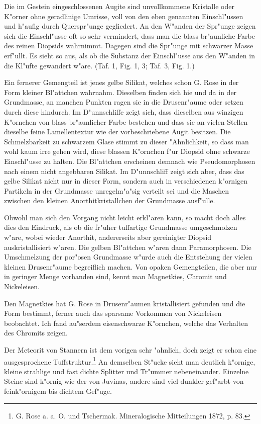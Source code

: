\documentclass[a4paper, 11pt, oneside, polutonikogreek, german]{article}
\begin{document}
Die im Gestein eingeschlossenen Augite sind unvollkommene Kristalle oder K"orner ohne geradlinige Umrisse, voll von den eben genannten Einschl"ussen und h"aufig durch Querspr"unge gegliedert. An den W"anden der Spr"unge zeigen sich die Einschl"usse oft so sehr vermindert, dass man die blass br"aunliche Farbe des reinen Diopsids wahrnimmt. Dagegen sind die Spr"unge mit schwarzer Masse erf"ullt. Es sieht so aus, als ob die Substanz der Einschl"usse aus den W"anden in die Kl"ufte gewandert w"are. (Taf. 1, Fig. 1, 3; Taf. 3, Fig. 1.)

Ein fernerer Gemengteil ist jenes gelbe Silikat, welches schon G. Rose in der Form kleiner Bl"attchen wahrnahm. Dieselben finden sich hie und da in der Grundmasse, an manchen Punkten ragen sie in die Drusenr"aume oder setzen durch diese hindurch. Im D"unnschliffe zeigt sich, dass dieselben aus winzigen K"ornchen von blass br"aunlicher Farbe bestehen und dass sie an vielen Stellen dieselbe feine Lamellentextur wie der vorbeschriebene Augit besitzen. Die Schmelzbarkeit zu schwarzem Glase stimmt zu dieser "Ahnlichkeit, so dass man wohl kaum irre gehen wird, diese blassen K"ornchen f"ur Diopsid ohne schwarze Einschl"usse zu halten. Die Bl"attchen erscheinen demnach wie Pseudomorphosen nach einem nicht angebbaren Silikat. Im D"unnschliff zeigt sich aber, dass das gelbe Silikat nicht nur in dieser Form, sondern auch in verschiedenen k"ornigen Partikeln in der Grundmasse unregelm"a"sig verteilt sei und die Maschen zwischen den kleinen Anorthitkristallchen der Grundmasse ausf"ulle.

Obwohl man sich den Vorgang nicht leicht erkl"aren kann, so macht doch alles dies den Eindruck, als ob die fr"uher tuffartige Grundmasse umgeschmolzen w"are, wobei wieder Anorthit, andererseits aber gereinigter Diopsid auskristallisiert w"aren. Die gelben Bl"attchen w"aren dann Paramorphosen. Die Umschmelzung der por"osen Grundmasse w"urde auch die Entstehung der vielen kleinen Drusenr"aume begreiflich machen. Von opaken Gemengteilen, die aber nur in geringer Menge vorhanden sind, kennt man Magnetkies, Chromit und Nickeleisen.

Den Magnetkies hat G. Rose in Drusenr"aumen kristallisiert gefunden und die Form bestimmt, ferner auch das sparsame Vorkommen von Nickeleisen beobachtet. Ich fand au"serdem eisenschwarze K"ornchen, welche das Verhalten des Chromits zeigen.

Der Meteorit von Stannern ist dem vorigen sehr "ahnlich, doch zeigt er schon eine ausgesprochene Tuffstruktur.\footnote{G. Rose a. a. O. und Tschermak. Mineralogische Mitteilungen 1872, p. 83.} An demselben St"ucke sieht man deutlich k"ornige, kleine strahlige und fast dichte Splitter und Tr"ummer nebeneinander. Einzelne Steine sind k"ornig wie der von Juvinas, andere sind viel dunkler gef"arbt von feink"ornigem bis dichtem Gef"uge.
\end{document}
